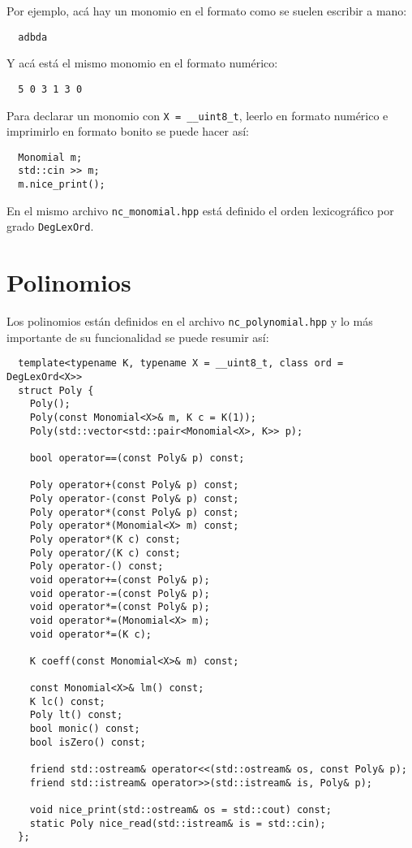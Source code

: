 \documentclass[12pt]{report}
\theoremstyle{customstyle}
\theoremstyle{factstyle}
\begin{document}
Por ejemplo, acá hay un monomio en el formato como se suelen escribir a mano:

\begin{lstlisting}
  adbda
\end{lstlisting}

\noindent Y acá está el mismo monomio en el formato numérico:

\begin{lstlisting}
  5 0 3 1 3 0
\end{lstlisting}

Para declarar un monomio con \texttt{X = \_\_uint8\_t}, leerlo en formato numérico e imprimirlo en formato bonito se puede hacer así:

\begin{verbatim}
  Monomial m;
  std::cin >> m;
  m.nice_print();
\end{verbatim}

En el mismo archivo \texttt{nc\_monomial.hpp} está definido el orden lexicográfico por grado \texttt{DegLexOrd}.

\section{Polinomios}

Los polinomios están definidos en el archivo \texttt{nc\_polynomial.hpp} y lo más importante de su funcionalidad se puede resumir así:

\begin{verbatim}
  template<typename K, typename X = __uint8_t, class ord = DegLexOrd<X>>
  struct Poly {
    Poly();
    Poly(const Monomial<X>& m, K c = K(1));
    Poly(std::vector<std::pair<Monomial<X>, K>> p);

    bool operator==(const Poly& p) const;

    Poly operator+(const Poly& p) const;
    Poly operator-(const Poly& p) const;
    Poly operator*(const Poly& p) const;
    Poly operator*(Monomial<X> m) const;
    Poly operator*(K c) const;
    Poly operator/(K c) const;
    Poly operator-() const;
    void operator+=(const Poly& p);
    void operator-=(const Poly& p);
    void operator*=(const Poly& p);
    void operator*=(Monomial<X> m);
    void operator*=(K c);

    K coeff(const Monomial<X>& m) const;

    const Monomial<X>& lm() const;
    K lc() const;
    Poly lt() const;
    bool monic() const;
    bool isZero() const;

    friend std::ostream& operator<<(std::ostream& os, const Poly& p);
    friend std::istream& operator>>(std::istream& is, Poly& p);

    void nice_print(std::ostream& os = std::cout) const;
    static Poly nice_read(std::istream& is = std::cin);
  };
\end{verbatim}
\end{document}
